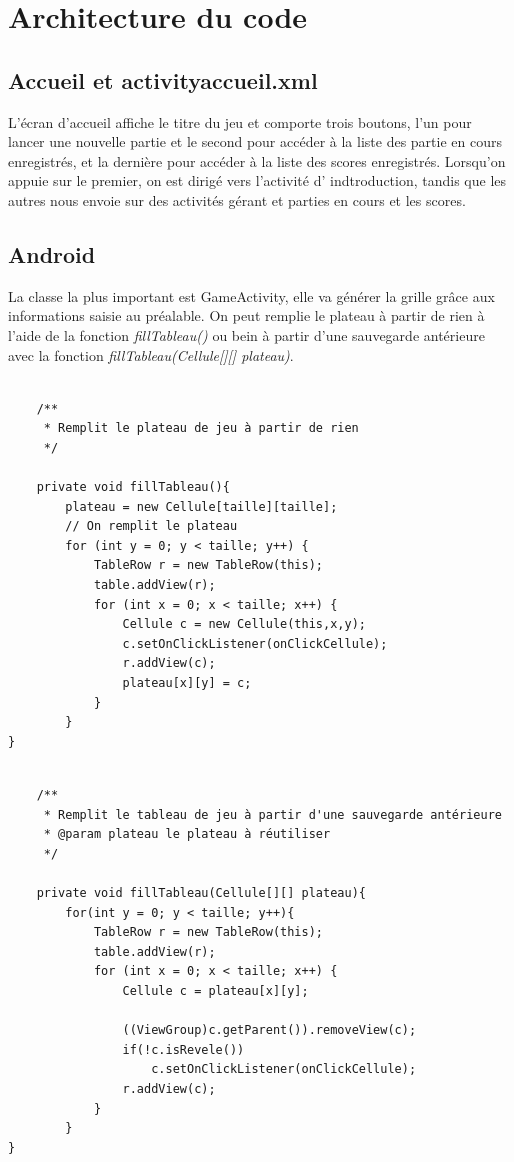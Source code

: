 \documentclass{article}
\begin{document}
\section{Architecture du code}
\subsection{Accueil et activityaccueil.xml}
L’écran d’accueil affiche le titre du jeu et comporte trois boutons, l’un pour lancer une nouvelle
partie et le second pour accéder à la liste des partie en cours  enregistrés, et la dernière pour accéder à la liste des scores enregistrés. Lorsqu’on appuie sur le premier, on est dirigé vers l’activité d' indtroduction, tandis que les autres nous envoie sur des activités
gérant et parties en cours et les scores.

\subsection{Android} %
La classe la plus important est GameActivity, elle va générer la grille grâce aux informations saisie au préalable.
On peut remplie le plateau à partir de rien à l'aide de la fonction  \textit{fillTableau()} ou bein à partir d'une sauvegarde antérieure  avec la fonction \textit{fillTableau(Cellule[][] plateau)}.

\begin{verbatim}

    /**
     * Remplit le plateau de jeu à partir de rien
     */

    private void fillTableau(){
        plateau = new Cellule[taille][taille];
        // On remplit le plateau
        for (int y = 0; y < taille; y++) {
            TableRow r = new TableRow(this);
            table.addView(r);
            for (int x = 0; x < taille; x++) {
                Cellule c = new Cellule(this,x,y);
                c.setOnClickListener(onClickCellule);
                r.addView(c);
                plateau[x][y] = c;
            }
        }
}

\end{verbatim}

\begin{verbatim}

    /**
     * Remplit le tableau de jeu à partir d'une sauvegarde antérieure
     * @param plateau le plateau à réutiliser
     */

    private void fillTableau(Cellule[][] plateau){
        for(int y = 0; y < taille; y++){
            TableRow r = new TableRow(this);
            table.addView(r);
            for (int x = 0; x < taille; x++) {
                Cellule c = plateau[x][y];

                ((ViewGroup)c.getParent()).removeView(c);
                if(!c.isRevele())
                    c.setOnClickListener(onClickCellule);
                r.addView(c);
            }
        }
}

\end{verbatim}
\end{document}
